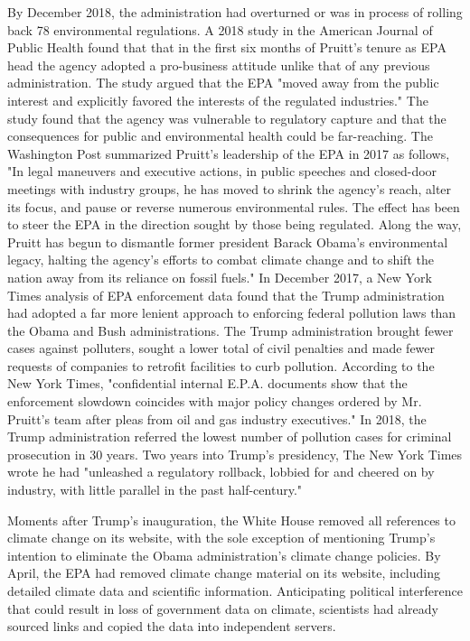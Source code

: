 By December 2018, the administration had overturned or was in process of
rolling back 78 environmental regulations. A 2018 study in the American
Journal of Public Health found that that in the first six months of
Pruitt's tenure as EPA head the agency adopted a pro-business attitude
unlike that of any previous administration. The study argued that the
EPA "moved away from the public interest and explicitly favored the
interests of the regulated industries." The study found that the agency
was vulnerable to regulatory capture and that the consequences for
public and environmental health could be far-reaching. The Washington
Post summarized Pruitt's leadership of the EPA in 2017 as follows, "In
legal maneuvers and executive actions, in public speeches and
closed-door meetings with industry groups, he has moved to shrink the
agency's reach, alter its focus, and pause or reverse numerous
environmental rules. The effect has been to steer the EPA in the
direction sought by those being regulated. Along the way, Pruitt has
begun to dismantle former president Barack Obama's environmental legacy,
halting the agency's efforts to combat climate change and to shift the
nation away from its reliance on fossil fuels." In December 2017, a New
York Times analysis of EPA enforcement data found that the Trump
administration had adopted a far more lenient approach to enforcing
federal pollution laws than the Obama and Bush administrations. The
Trump administration brought fewer cases against polluters, sought a
lower total of civil penalties and made fewer requests of companies to
retrofit facilities to curb pollution. According to the New York Times,
"confidential internal E.P.A. documents show that the enforcement
slowdown coincides with major policy changes ordered by Mr. Pruitt's
team after pleas from oil and gas industry executives." In 2018, the
Trump administration referred the lowest number of pollution cases for
criminal prosecution in 30 years. Two years into Trump's presidency, The
New York Times wrote he had "unleashed a regulatory rollback, lobbied
for and cheered on by industry, with little parallel in the past
half-century."

Moments after Trump's inauguration, the White House removed all
references to climate change on its website, with the sole exception of
mentioning Trump's intention to eliminate the Obama administration's
climate change policies. By April, the EPA had removed climate change
material on its website, including detailed climate data and scientific
information. Anticipating political interference that could result in
loss of government data on climate, scientists had already sourced links
and copied the data into independent servers.

